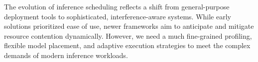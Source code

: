 The evolution of inference scheduling reflects a shift from general-purpose deployment tools to sophisticated, interference-aware systems. While early solutions prioritized ease of use, newer frameworks aim to anticipate and mitigate resource contention dynamically. However, we need a much fine-grained profiling, flexible model placement, and adaptive execution strategies to meet the complex demands of modern inference workloads.
